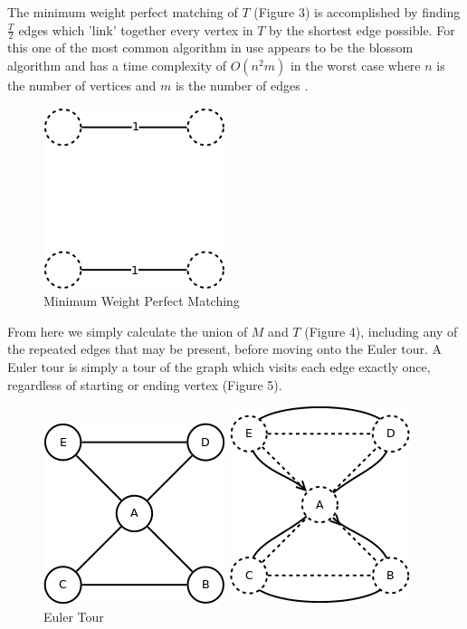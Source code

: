 \documentclass[11pt,a4paper,titlepage]{article}
\begin{document}
The minimum weight perfect matching of $T$ (Figure 3) is accomplished by finding $\frac{T}{2}$ edges which 'link' together every vertex in $T$ by the shortest edge possible. For this one of the most common algorithm in use appears to be the blossom algorithm and has a time complexity of $O(n^2 m)$ in the worst case where $n$ is the number of vertices and $m$ is the number of edges \cite{BlosAlg}.

\begin{figure}[ht]
	\includegraphics[scale=0.6]{WikiMinMatch}
	\centering
	\caption{Minimum Weight Perfect Matching}
\end{figure}

From here we simply calculate the union of $M$ and $T$ (Figure 4), including any of the repeated edges that may be present, before moving onto the Euler tour. A Euler tour is simply a tour of the graph which visits each edge exactly once, regardless of starting or ending vertex (Figure 5).

\begin{figure}[ht]
	\centering
		\begin{minipage}{0.45\textwidth}
			\centering
			\includegraphics[scale=0.5]{WikiComb}
			\caption{$M \bigcup T$}
		\end{minipage}\hfill
		\begin{minipage}{0.45\textwidth}
			\centering
			\includegraphics[scale=0.5]{WikiEulerTour}
			\caption{Euler Tour}
		\end{minipage}\hfill
\end{figure}
\end{document}
